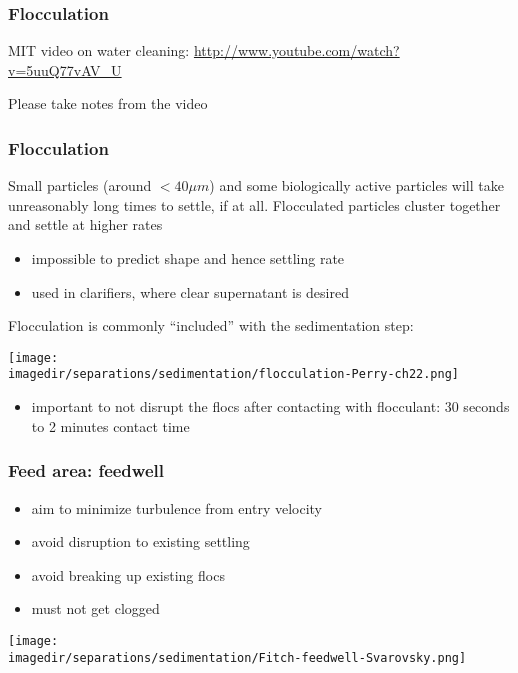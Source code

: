 \begin{frame}\frametitle{Flocculation}
	MIT video on water cleaning: \href{http://www.youtube.com/watch?v=5uuQ77vAV\_U}{http://www.youtube.com/watch?v=5uuQ77vAV\_U}

	\vspace{7cm}
	{\tiny Please take notes from the video}
\end{frame}

\begin{frame}\frametitle{Flocculation}
	Small particles (around $< 40 \mu m$) and some biologically active particles will take unreasonably long times to settle, if at all.
	\vspace{12pt}
	Flocculated particles cluster together and settle at higher rates
	\begin{itemize}
		\item	impossible to predict shape and hence settling rate
		\item	used in clarifiers, where clear supernatant is desired
	\end{itemize}
	\vspace{12pt}
	Flocculation is commonly ``included'' with the sedimentation step:
	\begin{center}
		\texttt{[image: \\imagedir/separations/sedimentation/flocculation-Perry-ch22.png]}
	\end{center}
	\begin{itemize}
		\item	important to not disrupt the flocs after contacting with flocculant: 30 seconds to 2 minutes contact time
	\end{itemize}
\end{frame}

\begin{frame}\frametitle{Feed area: feedwell}
	\begin{itemize}
		\item	aim to minimize turbulence from entry velocity
		\item	avoid disruption to existing settling
		\item	avoid breaking up existing flocs
		\item	must not get clogged
	\end{itemize}

	\begin{center}
		\texttt{[image: \\imagedir/separations/sedimentation/Fitch-feedwell-Svarovsky.png]}
	\end{center}
\end{frame}

